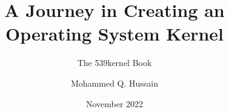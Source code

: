 \documentclass[11pt,a4paper,footinclude=true,headinclude=true,oneside]{scrbook} %
\begin{document}
    \title{A Journey in Creating an Operating System Kernel}
    \subtitle{The 539kernel Book}
    \author{Mohammed Q. Hussain}
    \date{November 2022}

    \maketitle
	\tableofcontents 
	
	
    
    
    
    
    
    
    
\end{document}

